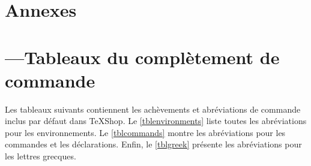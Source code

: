 \documentclass[11pt,french]{article}
\newcommand{\TS}{\textsf{\TeX Shop}}
\newcommand{\cmd}[1]{\textsf{#1}}
\begin{document}
\section*{Annexes}
\appendix

\section{---\quad Tableaux du complètement de commande}\label{secCCTables}
%
%

Les tableaux suivants contiennent les achèvements et abréviations de commande inclus par défaut dans \TS. Le \cref{tblenvironments}  liste toutes les abréviations pour les environnements. Le \cref{tblcommands}  montre les abréviations pour les commandes et les déclarations. Enfin, le \cref{tblgreek}  présente les abréviations pour les lettres grecques.
\end{document}
